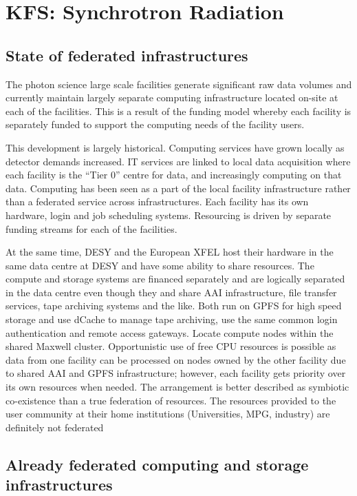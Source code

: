 \section{KFS: Synchrotron Radiation}


\subsection{State of federated infrastructures}

The photon science large scale facilities generate significant raw data
volumes and currently maintain largely separate computing infrastructure
located on-site at each of the facilities. This is a result of the
funding model whereby each facility is separately funded to support the
computing needs of the facility users. 

This development is largely historical. Computing services have grown
locally as detector demands increased.  IT services are linked to local
data acquisition where each facility is the ``Tier 0'' centre for data,
and increasingly computing on that data.  Computing has been seen as a
part of the local facility infrastructure rather than a federated
service across infrastructures. Each facility has its own hardware,
login and job scheduling systems.  Resourcing is driven by separate
funding streams for each of the facilities.

At the same time, DESY and the European XFEL host their hardware in the
same data centre at DESY and have some ability to share resources. The
compute and storage systems are financed separately and are logically
separated in the data centre even though they and share AAI
infrastructure, file transfer services, tape archiving systems and the
like. Both run on GPFS for high speed storage and use dCache	 to manage
tape archiving, use the same common login authentication and remote
access gateways. Locate compute nodes within the shared Maxwell cluster.
Opportunistic use of free CPU resources is possible as data from one
facility can be processed on nodes owned by the other facility due to
shared AAI and GPFS infrastructure; however, each facility gets priority
over its own resources when needed. The arrangement is better described
as symbiotic co-existence than a true federation of resources.  The
resources provided to the user community at their home institutions
(Universities, MPG, industry) are definitely not federated

\subsection{Already federated computing and storage infrastructures}


